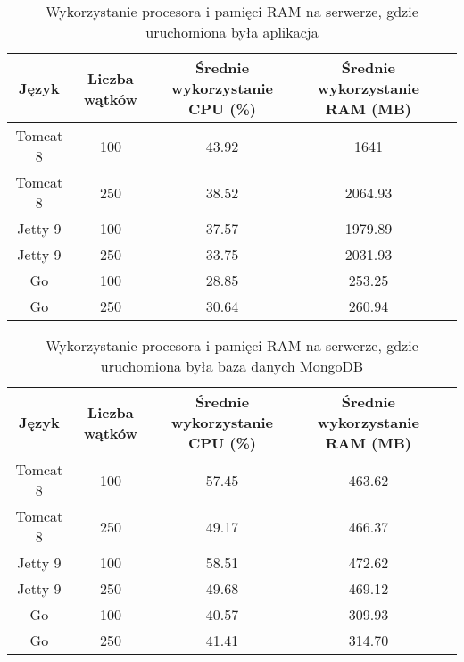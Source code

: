 
\begin{table}[!htb]
\centering
\caption{Wykorzystanie procesora i pamięci RAM na serwerze, gdzie uruchomiona była aplikacja}
\label{tab:app-full-all}
\begin{tabular}{@{}ccccl@{}}
\toprule
\textbf{Język} & \textbf{Liczba wątków} & \multicolumn{1}{p{3cm}}{\textbf{Średnie wykorzystanie CPU (\%)}} & \multicolumn{1}{p{3cm}}{\textbf{Średnie wykorzystanie RAM (MB)}} &  \\ \midrule
Tomcat 8       & 100                    & 43.92                             & 1641                          &  \\
Tomcat 8       & 250                    & 38.52                             & 2064.93                          &  \\
Jetty 9       & 100                    & 37.57                             & 1979.89                          &  \\
Jetty 9       & 250                    & 33.75                             & 2031.93                          &  \\
Go       & 100                    & 28.85                             & 253.25                          &  \\
Go       & 250                    & 30.64                             & 260.94                          &  \\
\bottomrule
\end{tabular}
\end{table}


\begin{table}[!htb]
\centering
\caption{Wykorzystanie procesora i pamięci RAM na serwerze, gdzie uruchomiona była baza danych MongoDB}
\label{tab:mongo-full-all}
\begin{tabular}{@{}ccccl@{}}
\toprule
\textbf{Język} & \textbf{Liczba wątków} & \multicolumn{1}{p{3cm}}{\textbf{Średnie wykorzystanie CPU (\%)}} & \multicolumn{1}{p{3cm}}{\textbf{Średnie wykorzystanie RAM (MB)}} &  \\ \midrule
Tomcat 8       & 100                    & 57.45                             & 463.62                          &  \\
Tomcat 8       & 250                    & 49.17                             & 466.37                          &  \\
Jetty 9       & 100                    & 58.51                             & 472.62                          &  \\
Jetty 9       & 250                    & 49.68                             & 469.12                          &  \\
Go       & 100                    & 40.57                             & 309.93                          &  \\
Go       & 250                    & 41.41                             & 314.70                          &  \\
\bottomrule
\end{tabular}
\end{table}

